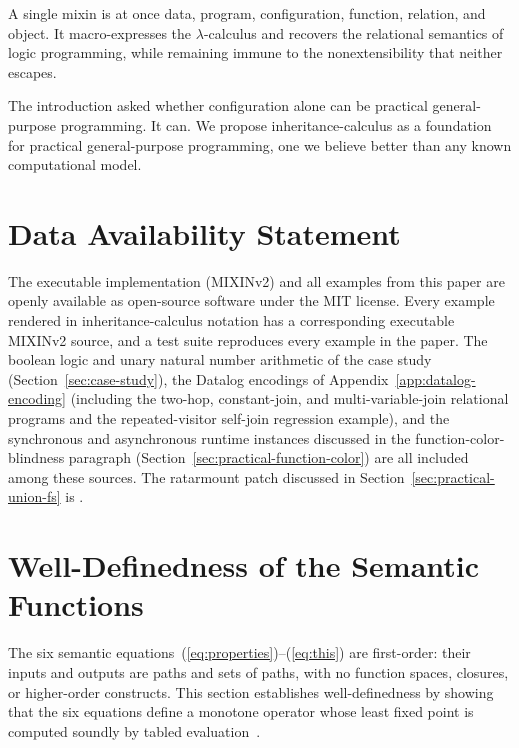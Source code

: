 A single mixin is at once data, program, configuration,
function, relation, and object.
It macro-expresses the $\lambda$-calculus and recovers the
relational semantics of logic programming, while remaining
immune to the nonextensibility that neither escapes.

The introduction asked whether configuration alone can be
practical general-purpose programming.
It can.
We propose inheritance-calculus as a foundation for practical
general-purpose programming, one we believe better than any
known computational model.

\section{Data Availability Statement}

The executable implementation (MIXINv2) and all examples from
this paper are openly available as open-source software under
the MIT license.
Every example rendered in inheritance-calculus notation has a
corresponding executable MIXINv2 source, and a test suite
reproduces every example in the paper.
The boolean logic and unary natural number arithmetic of the case
study (Section~\ref{sec:case-study}), the Datalog encodings of
Appendix~\ref{app:datalog-encoding} (including the two-hop,
constant-join, and multi-variable-join relational programs and the
repeated-visitor self-join regression example), and the synchronous
and asynchronous runtime instances discussed in the
function-color-blindness paragraph
(Section~\ref{sec:practical-function-color}) are all included among
these sources.
The ratarmount patch discussed in
Section~\ref{sec:practical-union-fs} is
.




\appendix

\section{Well-Definedness of the Semantic Functions}
\label{app:well-definedness}

The six semantic
equations~(\ref{eq:properties})--(\ref{eq:this}) are
first-order: their inputs and outputs are paths and sets of
paths, with no function spaces, closures, or higher-order
constructs.
This section establishes well-definedness by showing that
the six equations define a monotone operator whose least
fixed point is computed soundly by tabled
evaluation~\cite{tamaki1986-tabled-resolution}.

